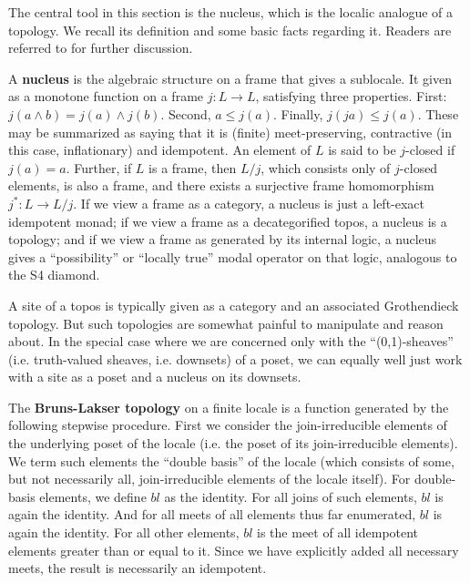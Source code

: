 \documentclass[a4paper,USenglish,cleveref, autoref, thm-restate,authorcolumns]{lipics-v2019}
\begin{document}
The central tool in this section is the nucleus, which is the localic analogue of a topology. We recall its definition and some basic facts regarding it. Readers are referred to \cite{johnstone1982stone, vickers1996topology} for further discussion.

A \textbf{nucleus} is the algebraic structure on a frame that gives a sublocale. It given as a monotone function on a frame \(j : L \rightarrow L\), satisfying three properties. First: \(j(a \wedge b) = j(a) \wedge j(b)\). Second, \(a \le j(a)\). Finally, \(j(ja) \le j(a)\). These may be summarized as saying that it is (finite) meet-preserving, contractive (in this case, inflationary) and idempotent. An element of \(L\) is said to be \(j\)-closed if \(j(a)=a\). Further, if \(L\) is a frame, then \(L/j\), which consists only of \(j\)-closed elements, is also a frame, and there exists a surjective frame homomorphism \(j^* : L \rightarrow L/j\). If we view a frame as a category, a nucleus is just a left-exact idempotent monad; if we view a frame as a decategorified topos, a nucleus is a topology; and if we view a frame as generated by its internal logic, a nucleus gives a ``possibility'' or ``locally true'' modal operator on that logic, analogous to the S4 diamond.

A site of a topos is typically given as a category and an associated Grothendieck topology. But such topologies are somewhat painful to manipulate and reason about. In the special case where we are concerned only with the ``(0,1)-sheaves'' (i.e. truth-valued sheaves, i.e. downsets) of a poset, we can equally well just work with a site as a poset and a nucleus on its downsets.

\begin{definition}
The \textbf{Bruns-Lakser topology} on a finite locale is a function generated by the following stepwise procedure. First we consider the join-irreducible elements of the underlying poset of the locale (i.e. the poset of its join-irreducible elements). We term such elements the ``double basis'' of the locale (which consists of some, but not necessarily all, join-irreducible elements of the locale itself). For double-basis elements, we define \(bl\) as the identity. For all joins of such elements, \(bl\) is again the identity. And for all meets of all elements thus far enumerated, \(bl\) is again the identity. For all other elements, \(bl\) is the meet of all idempotent elements greater than or equal to it. Since we have explicitly added all necessary meets, the result is necessarily an idempotent.
\end{definition}
\end{document}
